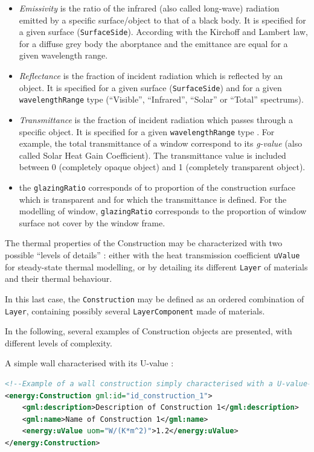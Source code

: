 \documentclass[a4paper,12pt]{article}
\begin{document}
\begin{itemize}
\item
  \emph{Emissivity} is the ratio of the infrared (also called long-wave)
  radiation emitted by a specific surface/object to that of a black
  body. It is specified for a given surface (\lstinline!SurfaceSide!).
  According with the Kirchoff and Lambert law, for a diffuse grey body
  the aborptance and the emittance are equal for a given wavelength
  range.
\item
  \emph{Reflectance} is the fraction of incident radiation which is
  reflected by an object. It is specified for a given surface
  (\lstinline!SurfaceSide!) and for a given \lstinline!wavelengthRange!
  type (``Visible'', ``Infrared'', ``Solar'' or ``Total'' spectrums).
\item
  \emph{Transmittance} is the fraction of incident radiation which
  passes through a specific object. It is specified for a given
  \lstinline!wavelengthRange! type . For example, the total
  transmittance of a window correspond to its \emph{g-value} (also
  called Solar Heat Gain Coefficient). The transmittance value is
  included between 0 (completely opaque object) and 1 (completely
  transparent object).
\item
  the \lstinline!glazingRatio! corresponds of to proportion of the
  construction surface which is transparent and for which the
  transmittance is defined. For the modelling of window,
  \lstinline!glazingRatio! corresponds to the proportion of window
  surface not cover by the window frame.
\end{itemize}

The thermal properties of the Construction may be characterized with two
possible ``levels of details'' : either with the heat transmission
coefficient \lstinline!uValue! for steady-state thermal modelling, or by
detailing its different \lstinline!Layer! of materials and their thermal
behaviour.

In this last case, the \lstinline!Construction! may be defined as an
ordered combination of \lstinline!Layer!, containing possibly several
\lstinline!LayerComponent! made of materials.

In the following, several examples of Construction objects are
presented, with different levels of complexity.

A simple wall characterised with its U-value :

\begin{lstlisting}[language=XML]
<!--Example of a wall construction simply characterised with a U-value-->
<energy:Construction gml:id="id_construction_1">
    <gml:description>Description of Construction 1</gml:description>
    <gml:name>Name of Construction 1</gml:name>
    <energy:uValue uom="W/(K*m^2)">1.2</energy:uValue>
</energy:Construction>
\end{lstlisting}
\end{document}
